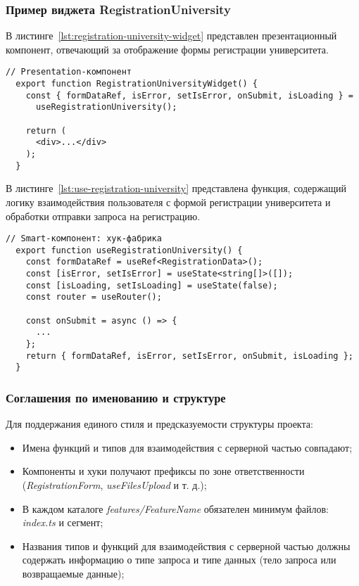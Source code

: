 \subsubsection{Пример виджета RegistrationUniversity}

В листинге~\ref{lst:registration-university-widget} представлен презентационный компонент, отвечающий за отображение формы регистрации университета.

\begin{lstlisting}[breaklines=true,caption=RegistrationUniversityWidget,label=lst:registration-university-widget]
  // Presentation-компонент
  export function RegistrationUniversityWidget() {
    const { formDataRef, isError, setIsError, onSubmit, isLoading } =
      useRegistrationUniversity();

    return (
      <div>...</div>
    );
  }
\end{lstlisting}

В листинге~\ref{lst:use-registration-university} представлена функция, содержащий логику взаимодействия пользователя с формой регистрации университета и обработки отправки запроса на регистрацию.

\begin{lstlisting}[breaklines=true,caption=useRegistrationUniversity,label=lst:use-registration-university]
  // Smart-компонент: хук-фабрика
  export function useRegistrationUniversity() {
    const formDataRef = useRef<RegistrationData>();
    const [isError, setIsError] = useState<string[]>([]);
    const [isLoading, setIsLoading] = useState(false);
    const router = useRouter();

    const onSubmit = async () => {
      ...
    };
    return { formDataRef, isError, setIsError, onSubmit, isLoading };
  }
\end{lstlisting}

\subsubsection{Соглашения по именованию и структуре}

Для поддержания единого стиля и предсказуемости структуры проекта:
\begin{itemize}
  \item Имена функций и типов для взаимодействия с серверной частью совпадают;
  \item Компоненты и хуки получают префиксы по зоне ответственности (\textit{RegistrationForm}, \textit{useFilesUpload} и т. д.);
  \item В каждом каталоге \textit{features/FeatureName} обязателен минимум файлов: \textit{index.ts} и сегмент;
  \item Названия типов и функций для взаимодействия с серверной частью должны содержать информацию о типе запроса и типе данных (тело запроса или возвращаемые данные);
\end{itemize}
